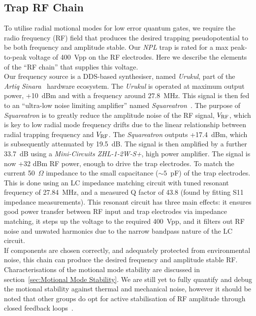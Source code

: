 \subsection{Trap RF Chain}
\label{sec:Trap RF Chain}
    To utilise radial motional modes for low error quantum gates, we require the
    radio frequency (RF) field that produces the desired trapping
    pseudopotential to be both frequency and amplitude stable. Our \emph{NPL}
    trap is rated for a max peak-to-peak voltage of 400~Vpp on the RF
    electrodes. Here we describe the elements of the ``RF chain'' that supplies
    this voltage. \\
    Our frequency source is a DDS-based synthesiser, named \emph{Urukul}, part
    of the \emph{Artiq Sinara}~\cite{XXX} hardware ecosystem. The
    \emph{Urukul} is operated at maximum output power, +10~dBm and with a frequency around $27.8$~MHz. This
    signal is then fed to an ``ultra-low noise limiting amplifier'' named
    \emph{Squareatron}~\cite{XXX}. The purpose of \emph{Squareatron} is to
    greatly reduce the amplitude noise of the RF signal, $V_{\rm RF}$, which is
    key to low radial mode frequency drifts due to the linear
    relationship between radial trapping frequency and $V_{\rm RF}$. The \emph{Squareatron} outputs +17.4~dBm,
    which is subsequently attenuated by 19.5~dB. The signal is then amplified by a
    further 33.7~dB using a \emph{Mini-Circuits ZHL-1-2W-S+}, high power
    amplifier. The signal is now +32 dBm RF power, enough to drive the trap
    electrodes. To match the current 50~$\Omega$ impedance to
    the small capacitance ($\sim 5$~pF) of the trap electrodes. This is done using an LC
    impedance matching circuit with tuned resonant frequency of 27.84~MHz, and a
    measured Q factor of 43.8 (found by fitting S11 impedance measurements).
    This resonant circuit has three main effects: it ensures good power transfer
    between RF input and trap electrodes via impedance matching, it steps up the
    voltage to the required 400~Vpp, and it filters out RF noise and unwated harmonics due to
    the narrow bandpass nature of the LC circuit. \\
    If components are chosen correctly, and adequately protected from
    environmental noise, this chain can produce the desired frequency and
    amplitude stable RF. Characterisations of the motional mode
    stability are discussed in section~\ref{sec:Motional Mode Stability}. We are
    still yet to fully quantify and debug the motional stability against thermal
    and mechanical noise, however it should be noted that other groups do opt
    for active stabilisation of RF amplitude through closed feedback loops~\cite{XXX}.\\

